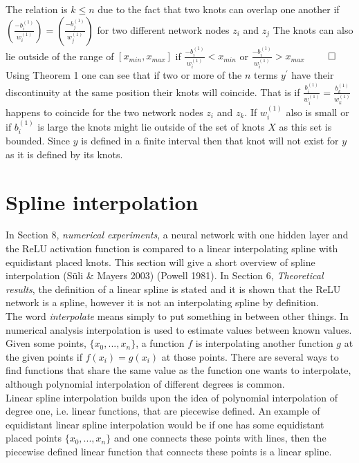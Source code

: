 \documentclass[11pt, letterpaper]{amsart}
\begin{document}
The relation is $k \leq n$ due to the fact that two knots can overlap one another if $(\frac{-b_i^{(1)}}{w_i^{(1)}}) = (\frac{-b_j^{(1)}}{w_j^{(1)}})$ for two different network nodes $z_i$ and $z_j$ The knots can also lie outside of the range of $[x_{min},x_{max}]$ if  $\frac{-b_i^{(1)}}{w_i^{(1)}} < x_{min}$ or $\frac{-b_i^{(1)}}{w_i^{(1)}} > x_{max}$ $\qed$
\\

Using Theorem 1 one can see that if two or more of the $n$ terms $y^\prime$ have their discontinuity at the same position their knots will coincide. That is if $\frac{b_i^{(1)}}{w_i^{(1)}} = \frac{b_k^{(1)}}{w_k^{(1)}}$ happens to coincide for the two network nodes $z_i$ and $z_k$. If $w^{(1)}_i$ also is small or if $b^{(1)}_i$ is large the knots might lie outside of the set of knots $X$ as this set is bounded. Since $y$ is defined in a finite interval then that knot will not exist for $y$ as it is defined by its knots.

\newpage

\section{Spline interpolation}
In Section 8, \textit{numerical experiments}, a neural network with one hidden layer and the ReLU activation function is compared to a linear interpolating spline with equidistant placed knots. This section will give a short overview of spline interpolation (Süli \& Mayers 2003) (Powell 1981). In Section 6, \textit{Theoretical results}, the definition of a linear spline is stated and it is shown that the ReLU network is a spline, however it is not an interpolating spline by definition.
\\

The word \textit{interpolate} means simply to put something in between other things. In numerical analysis interpolation is used to estimate values between known values. Given some points, $\{x_0,...,x_n\}$, a function $f$ is interpolating another function $g$ at the given points if $f(x_i) = g(x_i)$ at those points. There are several ways to find functions that share the same value as the function one wants to interpolate, although polynomial interpolation of different degrees is common.
\\

Linear spline interpolation builds upon the idea of polynomial interpolation of degree one, i.e. linear functions, that are piecewise defined. An example of equidistant linear spline interpolation would be if one has some equidistant placed points  $\{x_0,...,x_n\}$ and one connects these points with lines, then the piecewise defined linear function that connects these points is a linear spline.
\end{document}
